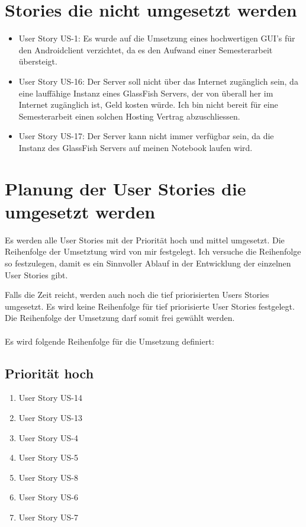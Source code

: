 \documentclass[abstracton, listof=totocnumbered,
bibliography=totocnumbered]{scrreprt}
\begin{document}
  \clearpage
  
  \section{Stories die nicht umgesetzt werden}
  
  \begin{itemize}
    \item User Story US-1: Es wurde auf die Umsetzung eines hochwertigen
    \ac{GUI}'s für den Androidclient verzichtet, da es den Aufwand einer
    Semesterarbeit übersteigt.
    \item User Story US-16: Der Server soll nicht über das Internet zugänglich
    sein, da eine lauffähige Instanz eines GlassFish Servers, der von überall
    her im Internet zugänglich ist, Geld kosten würde. Ich bin nicht bereit für
    eine Semesterarbeit einen solchen Hosting Vertrag abzuschliessen.
    \item User Story US-17: Der Server kann nicht immer verfügbar sein, da die
    Instanz des GlassFish Servers auf meinen Notebook laufen wird.
  \end{itemize}
  
  \section{Planung der User Stories die umgesetzt werden}
  
  Es werden alle User Stories mit der Priorität hoch und mittel umgesetzt. Die
  Reihenfolge der Umsetztung wird von mir festgelegt. Ich versuche die
  Reihenfolge so festzulegen, damit es ein Sinnvoller Ablauf in der Entwicklung
  der einzelnen User Stories gibt.
  
  Falls die Zeit reicht, werden auch noch die tief priorisierten Users Stories
  umgesetzt. Es wird keine Reihenfolge für tief priorisierte User Stories
  festgelegt. Die Reihenfolge der Umsetzung darf somit frei gewählt werden.\\
  \\
  Es wird folgende Reihenfolge für die Umsetzung definiert:

  \subsection{Priorität hoch}
  
  
  \begin{enumerate}
    \item User Story US-14
    \item User Story US-13
    \item User Story US-4
    \item User Story US-5
    \item User Story US-8
    \item User Story US-6
    \item User Story US-7
    \setcounter{userStoriesZaehler}{\value{enumi}}
  \end{enumerate}
  
\end{document}
